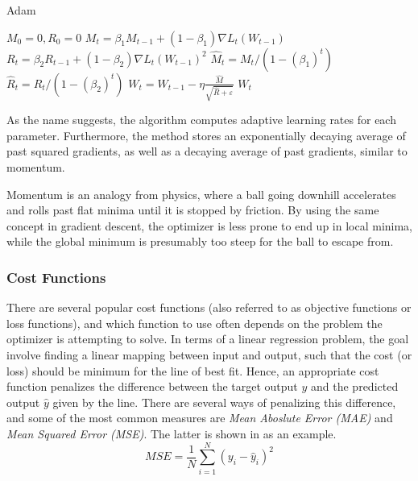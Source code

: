         {\centering
        \begin{minipage}{.6\textwidth}
            \begin{algorithm}[H]
            \caption{Adam}
            \begin{algorithmic}
                \STATE $M_0 = 0, R_0 = 0$
                    \STATE $M_t = \beta_1 M_{t-1} + (1-\beta_1) \nabla L_t(W_{t-1})$
                    \STATE $R_t = \beta_2 R_{t-1} + (1-\beta_2) \nabla L_t(W_{t-1})^2$
                    \STATE $\hat{M}_t = M_t / (1-(\beta_1)^t)$
                    \STATE $\hat{R}_t = R_t / (1-(\beta_2)^t)$
                    \STATE $W_t = W_{t-1} - \eta \frac{\hat{M}} {\sqrt{\hat{R}+\varepsilon}}$
                \ENDFOR
                \RETURN $W_t$
            \end{algorithmic}
            \end{algorithm}
        \end{minipage}
        \par}
        
        
        
        As the name suggests, the algorithm computes adaptive learning rates for each parameter. Furthermore, the method stores an exponentially decaying average of past squared gradients, as well as a decaying average of past gradients, similar to momentum.
        
        Momentum is an analogy from physics, where a ball going downhill accelerates and rolls past flat minima until it is stopped by friction. By using the same concept in gradient descent, the optimizer is less prone to end up in local minima, while the global minimum is presumably too steep for the ball to escape from.

    \subsubsection{Cost Functions}
    
        There are several popular cost functions (also referred to as objective functions or loss functions), and which function to use often depends on the problem the optimizer is attempting to solve. 
        In terms of a linear regression problem, the goal involve finding a linear mapping between input and output, such that the cost (or loss) should be minimum for the line of best fit. Hence, an appropriate cost function penalizes the difference between the target output $y$ and the predicted output $\hat{y}$ given by the line. 
        There are several ways of penalizing this difference, and some of the most common measures are \emph{Mean Aboslute Error (MAE)} and \emph{Mean Squared Error (MSE)}. The latter is shown in  as an example.
        \begin{equation}\label{eq:mopt-mseloss}
            MSE = \frac{1}{N}\sum_{i=1}^N(y_i-\hat{y}_i)^2
        \end{equation}
        
